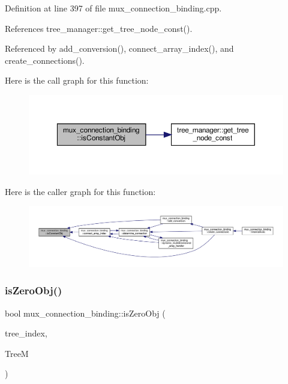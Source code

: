 Definition at line 397 of file mux\+\_\+connection\+\_\+binding.\+cpp.



References tree\+\_\+manager\+::get\+\_\+tree\+\_\+node\+\_\+const().



Referenced by add\+\_\+conversion(), connect\+\_\+array\+\_\+index(), and create\+\_\+connections().

Here is the call graph for this function\+:
\nopagebreak
\begin{figure}[H]
\begin{center}
\leavevmode
\includegraphics[width=350pt]{d7/d1e/classmux__connection__binding_a89c0ed6afea0b88bf31e8e6dcefc0f63_cgraph}
\end{center}
\end{figure}
Here is the caller graph for this function\+:
\nopagebreak
\begin{figure}[H]
\begin{center}
\leavevmode
\includegraphics[width=350pt]{d7/d1e/classmux__connection__binding_a89c0ed6afea0b88bf31e8e6dcefc0f63_icgraph}
\end{center}
\end{figure}
\mbox{\label{classmux__connection__binding_af8f0423ad663b8a5fb6b9a2f96dde90c}} 
\subsubsection{\texorpdfstring{is\+Zero\+Obj()}{isZeroObj()}}
{\footnotesize\ttfamily bool mux\+\_\+connection\+\_\+binding\+::is\+Zero\+Obj (\begin{DoxyParamCaption}\item[{unsigned int}]{tree\+\_\+index,  }\item[{const \hyperlink{tree__manager_8hpp_a96ff150c071ce11a9a7a1e40590f205e}{tree\+\_\+manager\+Ref}}]{TreeM }\end{DoxyParamCaption})\hspace{0.3cm}{\ttfamily [private]}}



